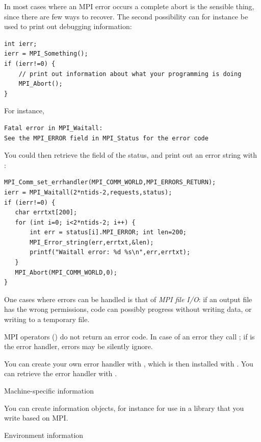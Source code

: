 In most cases where an MPI error occurs a complete abort is the
sensible thing, since there are few ways to recover. The second
possibility can for instance be used to print out debugging
information:
\begin{lstlisting}
int ierr;
ierr = MPI_Something();
if (ierr!=0) {
    // print out information about what your programming is doing
    MPI_Abort();
}
\end{lstlisting}
For instance,
\begin{verbatim}
Fatal error in MPI_Waitall: 
See the MPI_ERROR field in MPI_Status for the error code
\end{verbatim}
You could then retrieve the  field of the
status, and print out an error string with :
\begin{lstlisting}
MPI_Comm_set_errhandler(MPI_COMM_WORLD,MPI_ERRORS_RETURN);
ierr = MPI_Waitall(2*ntids-2,requests,status);
if (ierr!=0) {
   char errtxt[200];
   for (int i=0; i<2*ntids-2; i++) {
       int err = status[i].MPI_ERROR; int len=200;
       MPI_Error_string(err,errtxt,&len);
       printf("Waitall error: %d %s\n",err,errtxt);
   }
   MPI_Abort(MPI_COMM_WORLD,0);
}
\end{lstlisting}
One cases where errors can be handled is that of \emph{MPI file
  I/O}: if an output file has the wrong
permissions, code can possibly progress without writing data, or
writing to a temporary file.

MPI operators () do not return an error code. In case of
an error they call ; if 
is the error handler, errors may be silently ignore.

You can create your own error handler with
, which is then installed with
. You can retrieve the error
handler with .

 {Machine-specific information}
\label{sec:mpi-info}

You can create information objects, for instance for use in a library
that you write based on MPI.



 {Environment information}
\label{sec:mpi-info-env}

